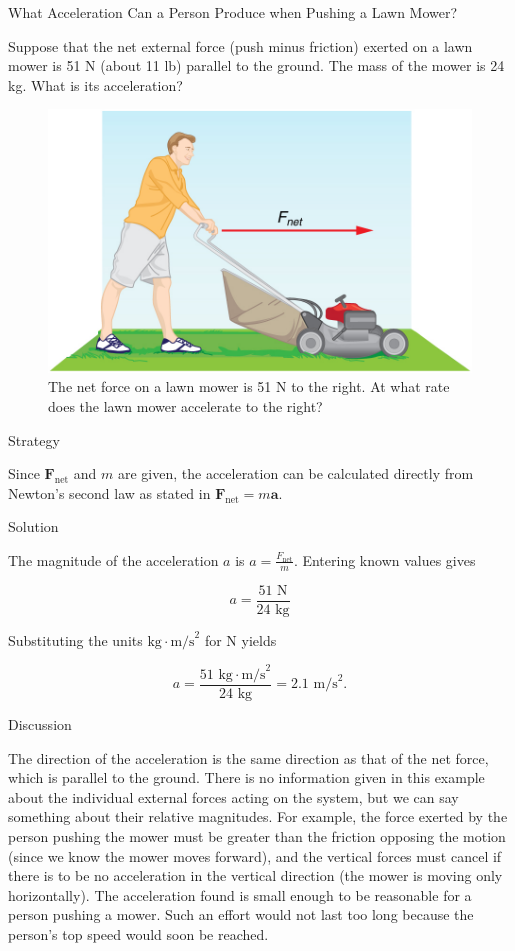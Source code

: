 \documentclass[
]{book}
\begin{document}
\hypertarget{fs-id1916412}{}
What Acceleration Can a Person Produce when Pushing a Lawn Mower?

Suppose that the net external force (push minus friction) exerted on a
lawn mower is 51 N (about 11 lb) parallel to the ground. The mass of the
mower is 24 kg. What is its acceleration?

\begin{figure}
\hypertarget{fs-id2602810}{%
\centering
\includegraphics{images/Figure 04_03_03.jpg}
\caption{The net force on a lawn mower is 51 N to the right. At what rate does
the lawn mower accelerate to the
right?}\label{fs-id2602810}
}
\end{figure}

{Strategy}

Since \(\textbf{F}_{\text{net}}{}\)\emph{} and
\(m{}\)\emph{} are given, the acceleration can be
calculated directly from Newton's second law as stated in
\({\textbf{F}_{\text{net}} = m\textbf{a}}{}\).

{Solution}

The magnitude of the acceleration \(a{}\) is
\({a = \frac{F_{\text{net}}}{m}}{}\). Entering known values gives

\leavevmode{}%
\[{a = \frac{\text{51\ N}}{\text{24\ kg}}}{}\]

Substituting the units \({\text{kg} \cdot \text{m/s}^{2}}{}\) for N yields

\leavevmode{}%
\[{{{a = \frac{\text{51\ kg} \cdot \text{m/s}^{2}}{\text{24\ kg}}} =}\text{2.1\ m}\text{/s}^{2}}.\]

{Discussion}

The direction of the acceleration is the same direction as that of the
net force, which is parallel to the ground. There is no information
given in this example about the individual external forces acting on the
system, but we can say something about their relative magnitudes. For
example, the force exerted by the person pushing the mower must be
greater than the friction opposing the motion (since we know the mower
moves forward), and the vertical forces must cancel if there is to be no
acceleration in the vertical direction (the mower is moving only
horizontally). The acceleration found is small enough to be reasonable
for a person pushing a mower. Such an effort would not last too long
because the person's top speed would soon be reached.
\end{document}
